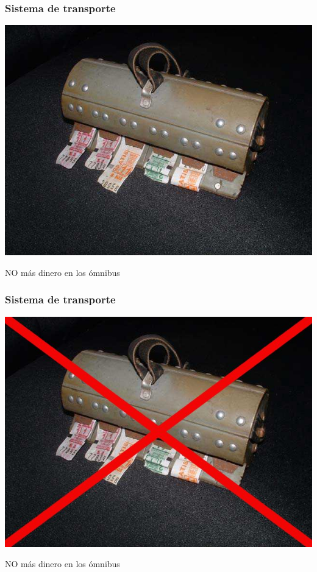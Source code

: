 \documentclass{beamer}
\begin{document}
\begin{frame}
	\frametitle{Sistema de transporte}
	\begin {center}
		\includegraphics[scale=.3]{Imagenes/boletera.jpg}
		
		\bigskip
		NO más dinero en los ómnibus
	\end{center}
\end{frame}

\begin{frame}
	\frametitle{Sistema de transporte}
	\begin {center}
		\includegraphics[scale=.3]{Imagenes/boletera_no.jpg}
		
		\bigskip
		NO más dinero en los ómnibus
	\end{center}
\end{frame}
\end{document}

